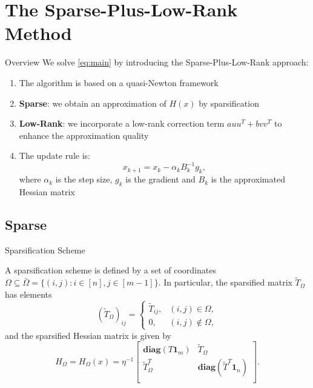 \section{The Sparse-Plus-Low-Rank Method}

\begin{frame}{Overview}
    We solve \eqref{eq:main} by introducing the Sparse-Plus-Low-Rank approach:
    \begin{enumerate}
        \item The algorithm is based on a quasi-Newton framework
        \item \textbf{Sparse}: we obtain an approximation of $H(x)$ by sparsification
        \item \textbf{Low-Rank}: we incorporate a low-rank correction term $auu^T + bvv^T$ to enhance the approximation quality
        \item The update rule is:
        \[
            x_{k+1}=x_k-\alpha_k B_k^{-1}g_k,
        \]
        where $\alpha_k$ is the step size, $g_k$ is the gradient and $B_k$ is the approximated Hessian matrix
    \end{enumerate}
\end{frame}

\subsection{Sparse}
\begin{frame}{Sparsification Scheme}
    \begin{definition}
    \label{def:sparsification-scheme}
    A sparsification scheme is defined by a set of coordinates $\Omega \subseteq \bar{\Omega} = \{(i, j): i \in [n], j \in [m-1] \}$. In particular, the sparsified matrix $\tilde{T}_{\Omega}$ has elements
    \begin{equation*}
    \label{eq:sparsified-T}
    (\tilde{T}_{\Omega})_{ij} = \begin{cases}
    \tilde{T}_{ij}, & (i,j)\in\Omega,\\
    0, & (i,j)\notin\Omega,
    \end{cases}
    \end{equation*}
    and the sparsified Hessian matrix is given by
    \begin{equation*}
    \label{eq:sparsified-Hessian}
    H_{\Omega}=H_{\Omega}(x) = \eta^{-1}\begin{bmatrix}
        \mathbf{diag}(T \mathbf{1}_m) & \tilde{T}_{\Omega} \\
        \tilde{T}_{\Omega}^{T} & \mathbf{diag}(\tilde{T}^{T} \mathbf{1}_n) \\
        \end{bmatrix}.
    \end{equation*}
    \end{definition}
\end{frame}

